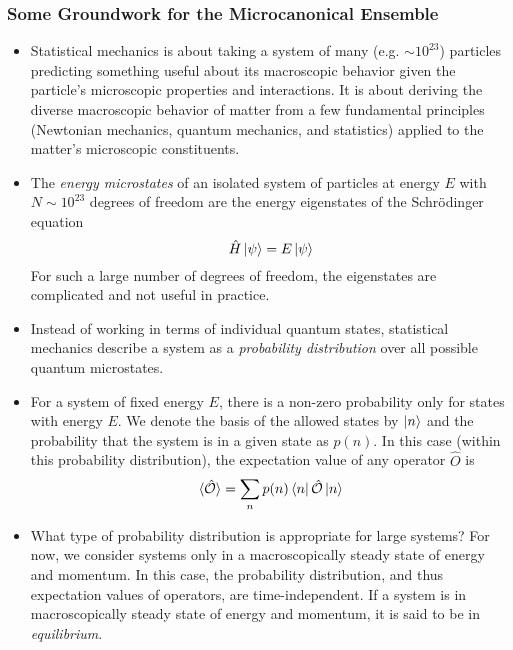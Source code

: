 \documentclass[11pt, a4paper]{article}
\newcommand{\schro}{Schr\"{o}dinger\xspace}
\begin{document}
\subsubsection{Some Groundwork for the Microcanonical Ensemble}
\begin{itemize} 
	\item 	Statistical mechanics is about taking a system of many (e.g. $\sim 10^{23} $) particles predicting something useful about its macroscopic behavior given the particle's microscopic properties and interactions. It is about deriving the diverse macroscopic behavior of matter from a few fundamental principles (Newtonian mechanics, quantum mechanics, and statistics) applied to the matter's microscopic constituents. 
	
	\item The \textit{energy microstates} of an isolated system of particles at energy $ E $ with $ N \sim 10^{23} $ degrees of freedom are the energy eigenstates of the \schro equation 
	\begin{equation*}
		\hat{H}\ket{\psi} = E\ket{\psi}
	\end{equation*}
	For such a large number of degrees of freedom, the eigenstates are complicated and not useful in practice.
	
	\item Instead of working in terms of individual quantum states, statistical mechanics describe a system as a \textit{probability distribution} over all possible quantum microstates.
	
	\item For a system of fixed energy $ E $, there is a non-zero probability only for states with energy $ E $. We denote the basis of the allowed states by $ \ket{n} $ and the probability that the system is in a given state as $ p(n) $. In this case (within this probability distribution), the expectation value of any operator $ \hat{O} $ is 
	\begin{equation*}
		\langle \hat{\mathcal{O}} \rangle = \sum_{n}p(n)\bra{n}\hat{\mathcal{O}}\ket{n}
	\end{equation*}
	
	\item What type of probability distribution is appropriate for large systems? For now, we consider systems only in a macroscopically steady state of energy and momentum. In this case, the probability distribution, and thus expectation values of operators, are time-independent. If a system is in macroscopically steady state of energy and momentum, it is said to be in \textit{equilibrium}.
	

\end{itemize}
\end{document}
